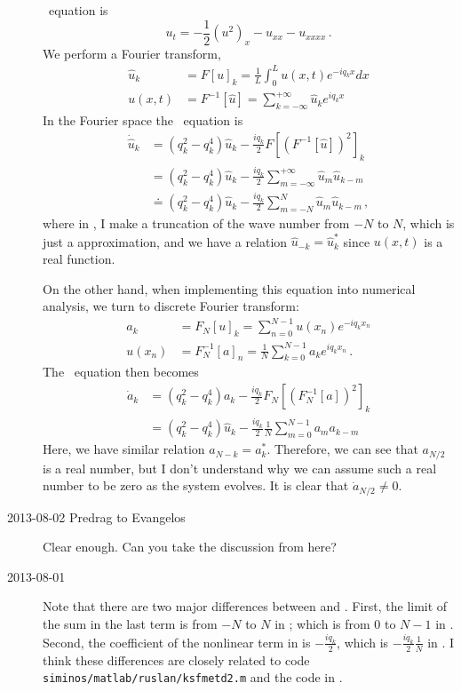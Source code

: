 \begin{description}
\KS\ equation is
\[
 u_t=-\frac{1}{2}(u^2)_x-u_{xx}-u_{xxxx}
 \,.
\]
We perform a Fourier transform,
\begin{align*}
 \hat{u}_{k} &= F[u]_{k}= \frac{1}{L}\int_{0}^{L} u(x,t)e^{-iq_{k}x}dx\\
 u(x,t) &= F^{-1}[\hat{u}] = \sum_{k=-\infty}^{+\infty} \hat{u}_{k} e^{iq_{k}x}
\end{align*}
In the Fourier space the \KS\ equation is
\begin{align}
 \dot{\hat{u}}_{k} &= (q^{2}_{k}-q^{4}_{k})\hat{u}_{k}-\frac{iq_{k}}{2}F[(F^{-1}[\hat{u}])^{2}]_{k}\nonumber\\
 &= (q^{2}_{k}-q^{4}_{k})\hat{u}_{k}-\frac{iq_{k}}{2} \sum_{m=-\infty}^{+\infty} \hat{u}_{m}\hat{u}_{k-m}\nonumber\\
 & \doteq (q^{2}_{k}-q^{4}_{k})\hat{u}_{k}-\frac{iq_{k}}{2} \sum_{m=-N}^{N} \hat{u}_{m}\hat{u}_{k-m}\label{xfft1}
\,,
\end{align}
where in , I make a truncation of the wave number from $-N$ to $N$, which is just a approximation, and we have
a relation $\hat{u}_{-k}=\hat{u}_{k}^{*}$ since $u(x,t)$ is a real function.

On the other hand, when implementing this equation into numerical
analysis, we turn to discrete Fourier transform:
\begin{align*}
 a_{k} &= F_{N}[u]_{k}= \sum_{n=0}^{N-1} u(x_{n})e^{-iq_{k}x_{n}}\\
 u(x_{n}) &= F_{N}^{-1}[a]_{n} = \frac{1}{N}\sum_{k=0}^{N-1} a_{k} e^{iq_{k}x_{n}}
\,.
\end{align*}
The \KS\ equation then becomes
\begin{align}
 \dot{a}_{k} &= (q^{2}_{k}-q^{4}_{k})a_{k}-\frac{iq_{k}}{2}F_{N}[(F_{N}^{-1}[a])^{2}]_{k}\nonumber\\
 &= (q^{2}_{k}-q^{4}_{k})\hat{u}_{k}-\frac{iq_{k}}{2} \frac{1}{N} \sum_{m=0}^{N-1} a_{m}a_{k-m} \label{xfft2}
\end{align}
Here, we have similar relation $a_{N-k}=a_{k}^{*}$. Therefore, we can see that $a_{N/2}$ is a real number, but I
don't understand why we can assume such a real number to be zero as the system evolves. It is clear that
$\dot{a}_{N/2}\ne 0$.

\item[2013-08-02 Predrag to Evangelos] Clear enough. Can you take
the discussion from here?

\item[2013-08-01 \XD]
Note that there are two major differences between  and . First, the limit of the sum in the
last term is from $-N$ to $N$ in ; which is from $0$ to $N-1$ in . Second, the coefficient of
the nonlinear term in  is $-\frac{iq_{k}}{2}$, which is $-\frac{iq_{k}}{2} \frac{1}{N}$ in .
I think these differences are closely related to code\\
\texttt{siminos/matlab/ruslan/ksfmetd2.m} and the code in .\\


\end{description}
